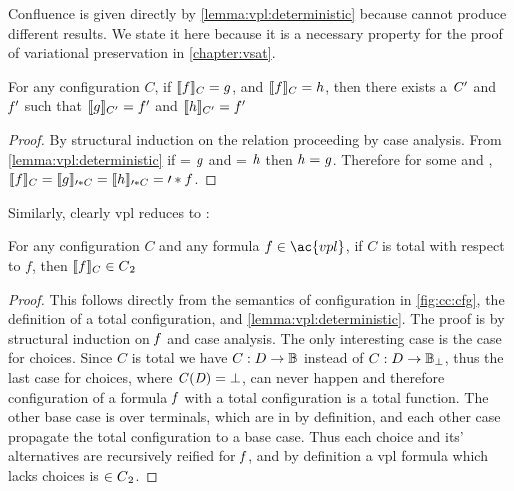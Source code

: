 Confluence is given directly by \autoref{lemma:vpl:deterministic} because
 cannot produce different results. We state it here because it is a
necessary property for the proof of variational preservation in
\autoref{chapter:vsat}.
%
\begin{theorem}
  \label{thm:vpl:confluent}
  For any configuration $C$, if \ensuremath{\semL f \semR_{C} = g}, and
  \ensuremath{\semL f \semR_{C} = h}, then there exists a $\mathit{C'}$ and
  $\mathit{f'}$ such that \ensuremath{\semL g \semR_{C'} = f'} and \ensuremath{\semL
    h \semR_{C'} = f'}
\end{theorem}
%
\begin{proof}
  By structural induction on the relation  proceeding by case
  analysis. From \autoref{lemma:vpl:deterministic} if  = $\mathit{g}$ and
   = $\mathit{h}$ then $\mathit{h = g}$. Therefore for some  and
  , $\sem[C]{f} = \sem[\prime*{C}]{g} = \sem[\prime*{C}]{h} =
  \prime*{f}$.
\end{proof}
%
Similarly, clearly \ac{vpl} reduces to \pl{}:
%
\begin{theorem}
  \label{thm:vpltopl}
  For any configuration $C$ and any formula $f \in \ac{vpl}$, if $C$ is total
  with respect to $f$, then $\sem[C]{f} \in \pl{}$
\end{theorem}
%
\begin{proof}
  This follows directly from the semantics of configuration in
  \autoref{fig:cc:cfg}, the definition of a total configuration, and
  \autoref{lemma:vpl:deterministic}. The proof is by structural induction on
  $\mathit{f}$ and case analysis. The only interesting case is the case for choices.
  Since $C$ is total we have $C : D \rightarrow \mathbb{B}{}$ instead of $C : D
  \rightarrow \mathbb{B}{}_{\bot}$, thus the last case for choices, where
  $\mathit{C(D)} = \bot$, can never happen and therefore configuration of a formula
  $\mathit{f}$ with a total configuration is a total function. The other base case
  is over terminals, which are in \pl{} by definition, and each other case
  propagate the total configuration to a base case. Thus each choice and its'
  alternatives are recursively reified for $\mathit{f}$, and by definition a
  \ac{vpl} formula which lacks choices is $\in {C\textsubscript{2}}{}$.
\end{proof}


